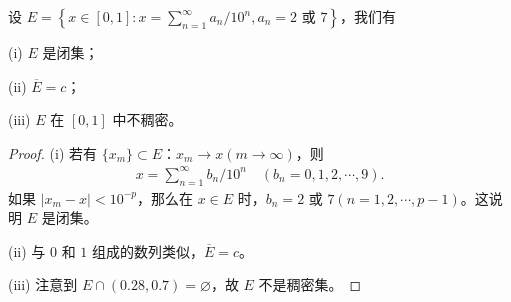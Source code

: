 \documentclass[../../main.tex]{subfiles}
\begin{document}
\begin{example}
设 \(E = \left\{x\in[0,1]: x = \sum_{n = 1}^{\infty}a_n/10^n, a_n = 2 \text{ 或 } 7\right\}\)，我们有

(i) \(E\) 是闭集； 

(ii) \(\overline{E}=c\)； 

(iii) \(E\) 在 \([0,1]\) 中不稠密。
\end{example}
\begin{proof}
(i) 若有 \(\{x_m\}\subset E\)：\(x_m\rightarrow x (m\rightarrow\infty)\)，则
\begin{align*}
x = \sum_{n = 1}^{\infty}b_n/10^n \quad (b_n = 0,1,2,\cdots,9).
\end{align*}
如果 \(|x_m - x|<10^{-p}\)，那么在 \(x\in E\) 时，\(b_n = 2 \text{ 或 } 7 (n = 1,2,\cdots,p - 1)\)。这说明 \(E\) 是闭集。

(ii) 与 \(0\) 和 \(1\) 组成的数列类似，\(\overline{E}=c\)。

(iii) 注意到 \(E\cap(0.28,0.7)=\varnothing\)，故 \(E\) 不是稠密集。 
\end{proof}
\end{document}

